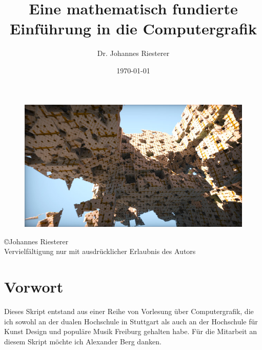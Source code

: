 \title{Eine mathematisch fundierte Einführung in die Computergrafik}
\author{Dr. Johannes Riesterer}
\date{\today}
\maketitle\thispagestyle{empty}
 \begin{figure}[H]
    \centering
    \includegraphics[width=1.0\textwidth]{images/cover.jpg}
    \label{fig:diffus}
\end{figure}
\newpage 
\begin{center}
\large
 \copyright Johannes Riesterer \\
Vervielfältigung nur mit ausdrücklicher Erlaubnis des Autors
\end{center}
\thispagestyle{empty}
\newpage

\section*{Vorwort}
\mbox{}\thispagestyle{empty}

Dieses Skript entstand aus einer Reihe von Vorlesung über Computergrafik, die ich sowohl an der dualen Hochschule in Stuttgart als auch an der Hochschule für 
Kunst Design und populäre Musik Freiburg gehalten habe. Für die Mitarbeit an diesem Skript möchte ich Alexander Berg  danken.



\newpage
